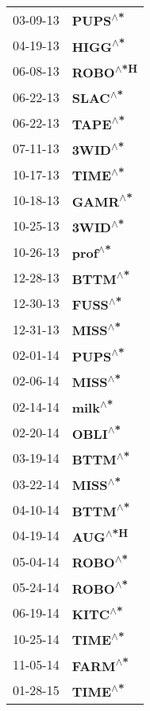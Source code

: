 \begin{supertabular}{p{0.08\textwidth}p{0.2\textwidth}}
 03-09-13 &   \textbf{PUPS\textsuperscript{$\wedge$*}} \\
 04-19-13 &   \textbf{HIGG\textsuperscript{$\wedge$*}} \\
 06-08-13 &  \textbf{ROBO\textsuperscript{$\wedge$*H}} \\
 06-22-13 &   \textbf{SLAC\textsuperscript{$\wedge$*}} \\
 06-22-13 &   \textbf{TAPE\textsuperscript{$\wedge$*}} \\
 07-11-13 &   \textbf{3WID\textsuperscript{$\wedge$*}} \\
 10-17-13 &   \textbf{TIME\textsuperscript{$\wedge$*}} \\
 10-18-13 &   \textbf{GAMR\textsuperscript{$\wedge$*}} \\
 10-25-13 &   \textbf{3WID\textsuperscript{$\wedge$*}} \\
 10-26-13 &   \textbf{prof\textsuperscript{$\wedge$*}} \\
 12-28-13 &   \textbf{BTTM\textsuperscript{$\wedge$*}} \\
 12-30-13 &   \textbf{FUSS\textsuperscript{$\wedge$*}} \\
 12-31-13 &   \textbf{MISS\textsuperscript{$\wedge$*}} \\
 02-01-14 &   \textbf{PUPS\textsuperscript{$\wedge$*}} \\
 02-06-14 &   \textbf{MISS\textsuperscript{$\wedge$*}} \\
 02-14-14 &   \textbf{milk\textsuperscript{$\wedge$*}} \\
 02-20-14 &   \textbf{OBLI\textsuperscript{$\wedge$*}} \\
 03-19-14 &   \textbf{BTTM\textsuperscript{$\wedge$*}} \\
 03-22-14 &   \textbf{MISS\textsuperscript{$\wedge$*}} \\
 04-10-14 &   \textbf{BTTM\textsuperscript{$\wedge$*}} \\
 04-19-14 &   \textbf{AUG\textsuperscript{$\wedge$*H}} \\
 05-04-14 &   \textbf{ROBO\textsuperscript{$\wedge$*}} \\
 05-24-14 &   \textbf{ROBO\textsuperscript{$\wedge$*}} \\
 06-19-14 &   \textbf{KITC\textsuperscript{$\wedge$*}} \\
 10-25-14 &   \textbf{TIME\textsuperscript{$\wedge$*}} \\
 11-05-14 &   \textbf{FARM\textsuperscript{$\wedge$*}} \\
 01-28-15 &   \textbf{TIME\textsuperscript{$\wedge$*}} \\

\end{supertabular}
